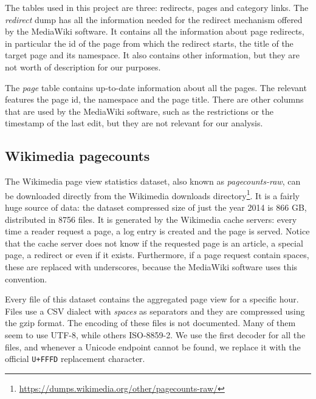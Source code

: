 The tables used in this project are three: redirects, pages and category links.
The \emph{redirect} dump has all the information needed for the redirect mechanism offered by the MediaWiki software.
It contains all the information about page redirects, in particular the id of the page from which the redirect starts, the title of the target page and its namespace.
It also contains other information, but they are not worth of description for our purposes.

The \emph{page} table contains up-to-date information about all the pages.
The relevant features the page id, the namespace and the page title.
There are other columns that are used by the MediaWiki software, such as the restrictions or the timestamp of the last edit, but they are not relevant for our analysis.


\subsection{Wikimedia pagecounts}
The Wikimedia page view statistics dataset, also known as \emph{pagecounts-raw}, can be downloaded directly from the Wikimedia downloads directory\footnote{\url{https://dumps.wikimedia.org/other/pagecounts-raw/}}.
It is a fairly huge source of data: the dataset compressed size of just the year 2014 is 866 GB, distributed in 8756 files.
It is generated by the Wikimedia cache servers: every time a reader request a page, a log entry is created and the page is served.
Notice that the cache server does not know if the requested page is an article, a special page, a redirect or even if it exists.
Furthermore, if a page request contain spaces, these are replaced with underscores, because the MediaWiki software uses this convention.

Every file of this dataset contains the aggregated page view for a specific hour.
Files use a CSV dialect with \emph{spaces} as separators and they are compressed using the gzip format.
The encoding of these files is not documented.
Many of them seem to use UTF-8, while others ISO-8859-2. %
We use the first decoder for all the files, and whenever a Unicode endpoint cannot be found, we replace it with the official \texttt{U+FFFD} replacement character.

